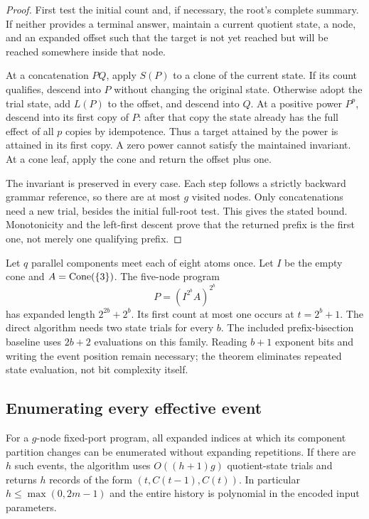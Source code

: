 \begin{proof}
First test the initial count and, if necessary, the root's complete summary.
If neither provides a terminal answer, maintain a current quotient state,
a node, and an expanded offset such that the target is not yet reached but
will be reached somewhere inside that node.

At a concatenation $PQ$, apply $S(P)$ to a clone of the current state. If
its count qualifies, descend into $P$ without changing the original state.
Otherwise adopt the trial state, add $L(P)$ to the offset, and descend into
$Q$. At a positive power $P^p$, descend into its first copy of $P$: after
that copy the state already has the full effect of all $p$ copies by
idempotence. Thus a target attained by the power is attained in its first
copy. A zero power cannot satisfy the maintained invariant. At a cone
leaf, apply the cone and return the offset plus one.

The invariant is preserved in every case. Each step follows a strictly
backward grammar reference, so there are at most $g$ visited nodes. Only
concatenations need a new trial, besides the initial full-root test. This
gives the stated bound. Monotonicity and the left-first descent prove that
the returned prefix is the first one, not merely one qualifying prefix.
\end{proof}

\begin{example}
Let $q$ parallel components meet each of eight atoms once. Let $I$ be the
empty cone and $A=\operatorname{Cone}(\{3\})$. The five-node program
\[
 P=(I^{2^b}A)^{2^b}
\]
has expanded length $2^{2b}+2^b$. Its first count at most one occurs at
$t=2^b+1$. The direct algorithm needs two state trials for every $b$.
The included prefix-bisection baseline uses $2b+2$ evaluations on this
family. Reading $b+1$ exponent bits and writing the event position remain
necessary; the theorem eliminates repeated state evaluation, not bit
complexity itself.
\end{example}

\subsection{Enumerating every effective event}

\begin{theorem}
\label{thm:history}
For a $g$-node fixed-port program, all expanded indices at which its
component partition changes can be enumerated without expanding repetitions.
If there are $h$ such events, the algorithm uses $O((h+1)g)$ quotient-state
trials and returns $h$ records of the form $(t,C(t-1),C(t))$.
In particular $h\le\max(0,2m-1)$ and the entire history is polynomial in
the encoded input parameters.
\end{theorem}

